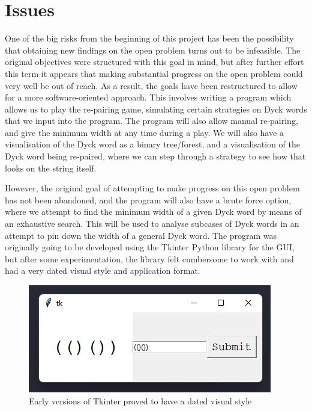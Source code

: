 \documentclass[a4paper]{article}
\begin{document}
	\section{Issues}
	One of the big risks from the beginning of this project has been the possibility that obtaining new findings on the open problem turns out to be infeasible. The original objectives were structured with this goal in mind, but after further effort this term it appears that making substantial progress on the open problem could very well be out of reach. As a result, the goals have been restructured to allow for a more software-oriented approach. This involves writing a program which allows us to play the re-pairing game, simulating certain strategies on Dyck words that we input into the program. The program will also allow manual re-pairing, and give the minimum width at any time during a play. We will also have a visualisation of the Dyck word as a binary tree/forest, and a visualisation of the Dyck word being re-paired, where we can step through a strategy to see how that looks on the string itself.
	
	However, the original goal of attempting to make progress on this open problem has not been abandoned, and the program will also have a brute force option, where we attempt to find the minimum width of a given Dyck word by means of an exhaustive search. This will be used to analyse subcases of Dyck words in an attempt to pin down the width of a general Dyck word.
	\newline
	\newline
	The program was originally going to be developed using the Tkinter Python library for the GUI, but after some experimentation, the library felt cumbersome to work with and had a very dated visual style and application format.
	\begin{figure}[!h]
		\includegraphics[width = \textwidth]{tkinter-gui.jpeg}
		\caption{Early versions of Tkinter proved to have a dated visual style}
	\end{figure}
\end{document}

